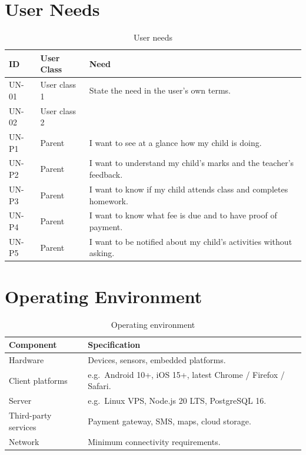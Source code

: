 \section{User Needs}\label{sec:userneeds}
\begin{table}[H]
\centering
\caption{User needs}\label{tab:userneeds}
\begin{tabularx}{\textwidth}{|L{1.5cm}|L{3cm}|X|}
\hline
{}\sffamily\bfseries ID & \sffamily\bfseries User Class & \sffamily\bfseries Need \\ \hline
UN-01 & User class 1 & State the need in the user's own terms. \\ \hline
UN-02 & User class 2 & \\ \hline
UN-P1 & Parent & I want to see at a glance how my child is doing. \\ \hline
UN-P2 & Parent & I want to understand my child's marks and the teacher's feedback. \\ \hline
UN-P3 & Parent & I want to know if my child attends class and completes homework. \\ \hline
UN-P4 & Parent & I want to know what fee is due and to have proof of payment. \\ \hline
UN-P5 & Parent & I want to be notified about my child's activities without asking. \\ \hline
\end{tabularx}
\end{table}

\section{Operating Environment}\label{sec:env}
\begin{table}[H]
\centering
\caption{Operating environment}\label{tab:env}
\begin{tabularx}{\textwidth}{|L{3.5cm}|X|}
\hline
{}\sffamily\bfseries Component & \sffamily\bfseries Specification \\ \hline
Hardware          & Devices, sensors, embedded platforms. \\ \hline
Client platforms  & e.g.\ Android 10+, iOS 15+, latest Chrome / Firefox / Safari. \\ \hline
Server            & e.g.\ Linux VPS, Node.js 20 LTS, PostgreSQL 16. \\ \hline
Third-party services & Payment gateway, SMS, maps, cloud storage. \\ \hline
Network           & Minimum connectivity requirements. \\ \hline
\end{tabularx}
\end{table}

